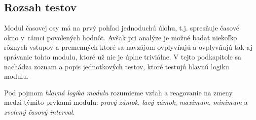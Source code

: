 \documentclass[
  printed, %
  twoside, %
  notable,   %
  nolof,   %
  nolot,   %
]{fithesis3}
\begin{document}
\subsection{Rozsah testov}
\label{sec:tests}
Modul časovej osy má na prvý pohľad jednoduchú úlohu, t.j. spresňuje časové okno v~rámci povolených hodnôt. Avšak pri analýze je možné badať niekoľko rôznych vstupov a premenných ktoré sa navzájom ovplyvňujú a ovplyvňujú tak aj správanie tohto modulu, ktoré už nie je úplne triviálne. V tejto podkapitole sa nachádza zoznam a popis jednotkových testov, ktoré testujú hlavnú logiku modulu.

Pod pojmom \textit{hlavná logika modulu} rozumieme vzťah a reagovanie na zmeny medzi týmito prvkami modulu: \textit{pravý zámok}, \textit{ľavý zámok}, \textit{maximum}, \textit{minimum} a \textit{zvolený časový interval}.
\end{document}
